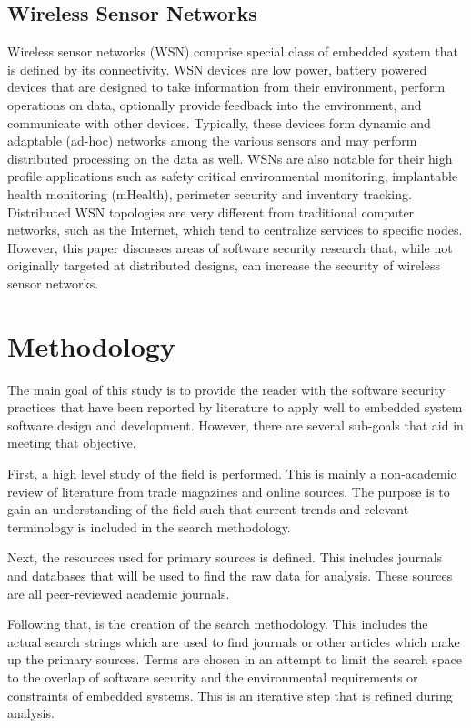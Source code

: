\documentclass[final]{article}
\begin{document}
\subsection{Wireless Sensor Networks}

Wireless sensor networks (WSN) comprise special class of embedded system that is defined by its connectivity.  WSN devices are low power, battery powered devices that are designed to take information from their environment, perform operations on data, optionally provide feedback into the environment, and communicate with other devices.  Typically, these devices form dynamic and adaptable (ad-hoc) networks among the various sensors and may perform distributed processing on the data as well.  WSNs are also notable for their high profile applications such as safety critical environmental monitoring, implantable health monitoring (mHealth), perimeter security and inventory tracking.\cite{Bojinov2010,Mahdavi-Hezavehi2013}  Distributed WSN topologies are very different from traditional computer networks, such as the Internet, which tend to centralize services to specific nodes. However, this paper discusses areas of software security research that, while not originally targeted at distributed designs, can increase the security of wireless sensor networks.

\section{Methodology}
The main goal of this study is to provide the reader with the software security practices that have been reported by literature to apply well to embedded system software design and development.  However, there are several sub-goals that aid in meeting that objective.  

First, a high level study of the field is performed.  This is mainly a non-academic review of literature from trade magazines and online sources. The purpose is to gain an understanding of the field such that current trends and relevant terminology is included in the search methodology.

Next, the resources used for primary sources is defined.  This includes journals and databases that will be used to find the raw data for analysis.  These sources are all peer-reviewed academic journals.

Following that, is the creation of the search methodology.  This includes the actual search strings which are used to find journals or other articles which make up the primary sources.  Terms are chosen in an attempt to limit the search space to the overlap of software security and the environmental requirements or constraints of embedded systems.  This is an iterative step that is refined during analysis.
\end{document}
